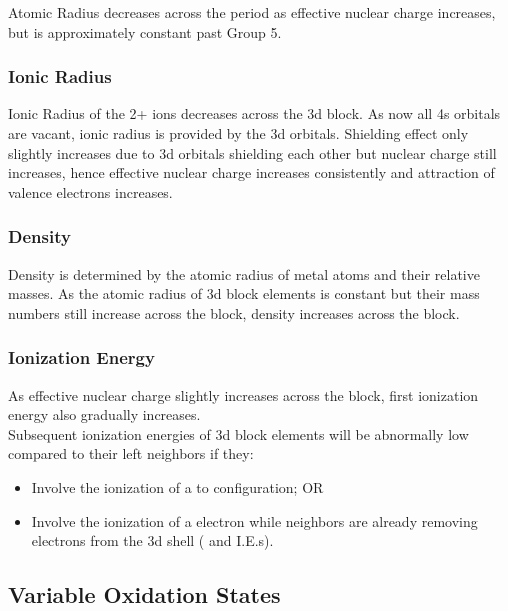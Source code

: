 \documentclass[../main]{subfiles}
\begin{document}
	Atomic Radius decreases across the period as effective nuclear charge increases, but is approximately constant past Group 5.

	\subsubsection{Ionic Radius}

	Ionic Radius of the 2+ ions decreases across the 3d block. As now all 4s orbitals are vacant, ionic radius is provided by the 3d orbitals. Shielding effect only slightly increases due to 3d orbitals shielding each other but nuclear charge still increases, hence effective nuclear charge increases consistently and attraction of valence electrons increases.

	\subsubsection{Density}

	Density is determined by the atomic radius of metal atoms and their relative masses. As the atomic radius of 3d block elements is constant but their mass numbers still increase across the block, density increases across the block.

	\subsubsection{Ionization Energy}

	As effective nuclear charge slightly increases across the block, first ionization energy also gradually increases. \\

	Subsequent ionization energies of 3d block elements will be abnormally low compared to their left neighbors if they:

	\begin{itemize}
		\item Involve the ionization of a  to  configuration; OR
		\item Involve the ionization of a  electron while neighbors are already removing electrons from the 3d shell ( and   I.E.s).
	\end{itemize}

	\subsection{Variable Oxidation States}
\end{document}
